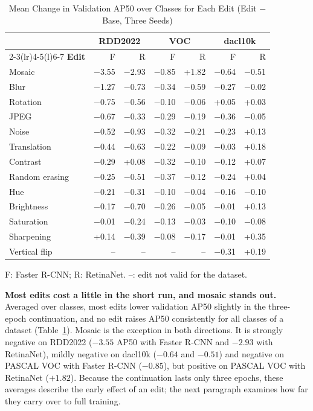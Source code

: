 \begin{table}[t]
\caption{Mean Change in Validation AP50 over Classes for Each Edit (Edit $-$ Base, Three Seeds)}
\label{tab:mean_effects}
\centering
\footnotesize
\setlength{\tabcolsep}{3.2pt}
\begin{tabular}{@{}lrrrrrr@{}}
\toprule
 & \multicolumn{2}{c}{\textbf{RDD2022}} & \multicolumn{2}{c}{\textbf{VOC}} & \multicolumn{2}{c}{\textbf{dacl10k}} \\
\cmidrule(lr){2-3}\cmidrule(lr){4-5}\cmidrule(l){6-7}
\textbf{Edit} & F & R & F & R & F & R \\
\midrule
Mosaic & $-$3.55 & $-$2.93 & $-$0.85 & +1.82 & $-$0.64 & $-$0.51 \\
Blur & $-$1.27 & $-$0.73 & $-$0.34 & $-$0.59 & $-$0.27 & $-$0.02 \\
Rotation & $-$0.75 & $-$0.56 & $-$0.10 & $-$0.06 & +0.05 & +0.03 \\
JPEG & $-$0.67 & $-$0.33 & $-$0.29 & $-$0.19 & $-$0.36 & $-$0.05 \\
Noise & $-$0.52 & $-$0.93 & $-$0.32 & $-$0.21 & $-$0.23 & +0.13 \\
Translation & $-$0.44 & $-$0.63 & $-$0.22 & $-$0.09 & $-$0.03 & +0.18 \\
Contrast & $-$0.29 & +0.08 & $-$0.32 & $-$0.10 & $-$0.12 & +0.07 \\
Random erasing & $-$0.25 & $-$0.51 & $-$0.37 & $-$0.12 & $-$0.24 & +0.04 \\
Hue & $-$0.21 & $-$0.31 & $-$0.10 & $-$0.04 & $-$0.16 & $-$0.10 \\
Brightness & $-$0.17 & $-$0.70 & $-$0.26 & $-$0.05 & $-$0.01 & +0.13 \\
Saturation & $-$0.01 & $-$0.24 & $-$0.13 & $-$0.03 & $-$0.10 & $-$0.08 \\
Sharpening & +0.14 & $-$0.39 & $-$0.08 & $-$0.17 & $-$0.01 & +0.35 \\
Vertical flip & -- & -- & -- & -- & $-$0.31 & +0.19 \\
\bottomrule
\end{tabular}
\vspace{2pt}

\parbox{\columnwidth}{\footnotesize F: Faster R-CNN; R: RetinaNet. --: edit not valid for the dataset.}
\end{table}

\noindent\textbf{Most edits cost a little in the short run, and mosaic stands out.} Averaged over classes, most edits lower validation AP50 slightly in the three-epoch continuation, and no edit raises AP50 consistently for all classes of a dataset (Table~\ref{tab:mean_effects}). Mosaic is the exception in both directions. It is strongly negative on RDD2022 ($-3.55$ AP50 with Faster R-CNN and $-2.93$ with RetinaNet), mildly negative on dacl10k ($-0.64$ and $-0.51$) and negative on PASCAL VOC with Faster R-CNN ($-0.85$), but positive on PASCAL VOC with RetinaNet ($+1.82$). Because the continuation lasts only three epochs, these averages describe the early effect of an edit; the next paragraph examines how far they carry over to full training.

